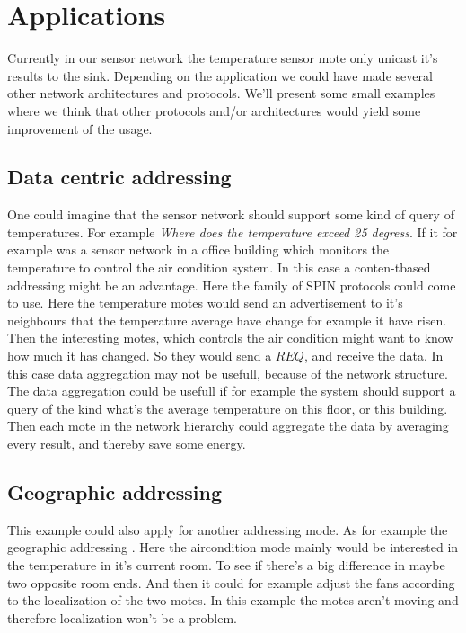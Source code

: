 \section{Applications}
Currently in our sensor network the temperature sensor mote only unicast it's results to the sink. Depending on the application we could have made several other network architectures and protocols. We'll present some small examples where we think that other protocols and/or architectures would yield some improvement of the usage.
\subsection{Data centric addressing}
 One could imagine that the sensor network should support some kind of query of temperatures. For example \emph{Where does the temperature exceed 25 degress}. If it for example was a sensor network in a office building which monitors the temperature to control the air condition system. In this case a conten-tbased addressing\cite[p.~194]{karl2007protocols} might be an advantage. Here the family of SPIN \cite[p.~335-336]{karl2007protocols} protocols could come to use. Here the temperature motes would send an advertisement to it's neighbours that the temperature average have change for example it have risen. Then the interesting motes, which controls the air condition might want to know how much it has changed. So they would send a $REQ$, and receive the data. In this case data aggregation may not be usefull, because of the network structure. The data aggregation could be usefull if for example the system should support a query of the kind what's the average temperature on this floor, or this building. Then each mote in the network hierarchy could aggregate the data by averaging every result, and thereby save some energy.
 \subsection{Geographic addressing}
This example could also apply for another addressing mode. As for example the geographic addressing \cite[p.~195]{karl2007protocols}. Here the aircondition mode mainly would be interested in the temperature in it's current room. To see if there's a big difference in maybe two opposite room ends. And then it could for example adjust the fans according to the localization of the two motes. In this example the motes aren't moving and therefore localization won't be a problem.

